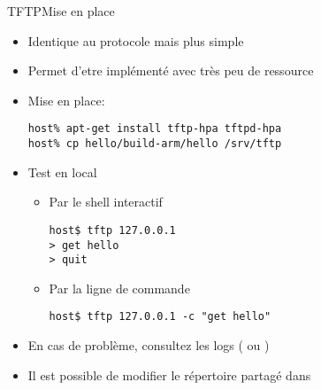 \begin{frame}[fragile=singleslide]{TFTP}{Mise en place}
  \begin{itemize}
  \item Identique au protocole  mais plus simple
  \item Permet d'etre implémenté avec très peu de ressource
  \item Mise en place:
    \begin{lstlisting}
host% apt-get install tftp-hpa tftpd-hpa
host% cp hello/build-arm/hello /srv/tftp
    \end{lstlisting}
  \item Test en local
    \begin{itemize}
    \item Par le shell interactif
      \begin{lstlisting}
host$ tftp 127.0.0.1
> get hello
> quit
      \end{lstlisting}
    \item Par la ligne de commande
      \begin{lstlisting}
host$ tftp 127.0.0.1 -c "get hello"
      \end{lstlisting} %
    \end{itemize}
  \item En cas de  problème, consultez les logs (
    ou )
  \item  Il  est  possible  de  modifier le  répertoire  partagé  dans
  \end{itemize}
\end{frame}  

